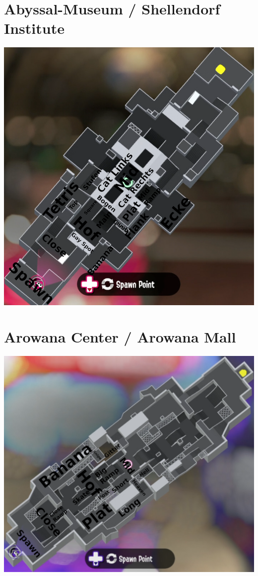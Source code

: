 \documentclass{scrreprt}
\begin{document}
\section{Abyssal-Museum / Shellendorf Institute}
\includegraphics[width=\linewidth]{img/shellendorfinstitute.png}
\section{Arowana Center / Arowana Mall}
\includegraphics[width=\linewidth]{img/arowanamall.png}
\end{document}
